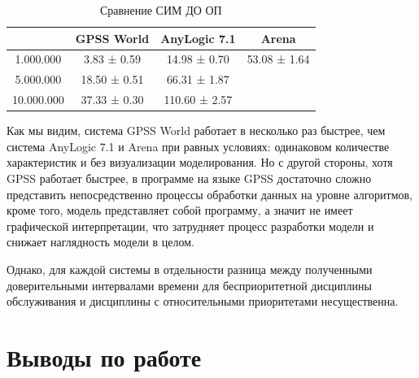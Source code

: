 \documentclass[a4paper,14pt]{report} %
\begin{document}
\begin{table}[h!]
\caption{Сравнение СИМ ДО ОП}
\begin{tabular}{|c|c|c|c|}
\hline
 & GPSS World & AnyLogic 7.1 & Arena \\
\hline
1.000.000 & 3.83 ± 0.59 & 14.98 ± 0.70 & 53.08 ± 1.64 \\
\hline
5.000.000 & 18.50 ± 0.51 & 66.31 ± 1.87 &  \\
\hline
10.000.000 & 37.33 ± 0.30 & 110.60 ± 2.57&  \\
\hline
\end{tabular}
\end{table} 

Как мы видим, система GPSS World работает в несколько раз быстрее, чем система AnyLogic 7.1 и Arena при равных условиях: одинаковом количестве характеристик и без визуализации моделирования. Но с другой стороны, хотя GPSS работает быстрее, в программе на языке GPSS достаточно сложно представить непосредственно процессы обработки данных на уровне алгоритмов, кроме того, модель представляет собой программу, а значит не имеет графической интерпретации, что затрудняет процесс разработки модели и снижает наглядность модели в целом.

Однако, для каждой системы в отдельности разница между полученными доверительными интервалами времени для бесприоритетной дисциплины обслуживания и дисциплины с относительными приоритетами несущественна.
\chapter{Выводы по работе}
\end{document}

